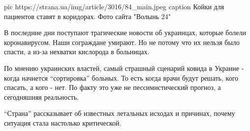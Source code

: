  
 
 
 
 
\ifcmt
pic https://strana.ua/img/article/3016/84_main.jpeg
caption Койки для пациентов ставят в коридорах. Фото сайта "Волынь 24" 
\fi

В последние дни поступают трагические новости об украинцах, которые болели
коронавирусом. Наши сограждане умирают. Но не потому что их нельзя было спасти,
а из-за нехватки кислорода в больницах. 

По мнению украинских властей, самый страшный сценарий ковида в Украине - когда
начнется \enquote{сортировка} больных. То есть когда врачи будут решать, кого спасать,
а кого - нет. По факту это уже не пессимистический прогноз, а сегодняшняя
реальность. 

\enquote{Страна} рассказывает об известных летальных исходах и причинах, почему
ситуация стала настолько критической. 
